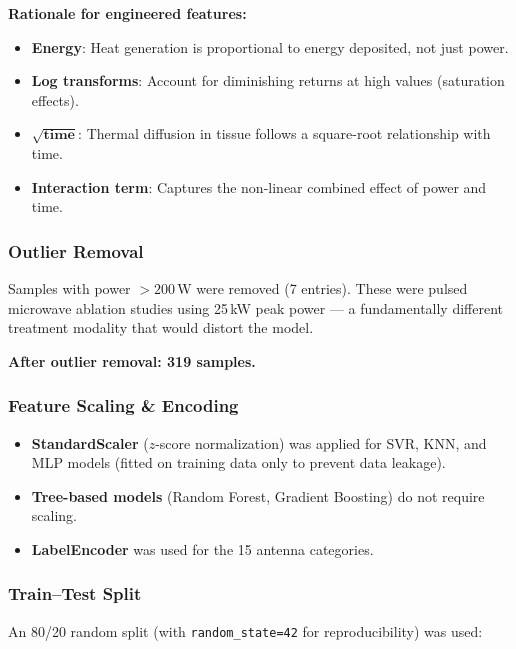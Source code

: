 \documentclass[12pt, a4paper]{article}
\begin{document}
\textbf{Rationale for engineered features:}
\begin{itemize}
    \item \textbf{Energy}: Heat generation is proportional to energy deposited, not just power.
    \item \textbf{Log transforms}: Account for diminishing returns at high values (saturation effects).
    \item $\boldsymbol{\sqrt{\text{time}}}$: Thermal diffusion in tissue follows a square-root relationship with time.
    \item \textbf{Interaction term}: Captures the non-linear combined effect of power and time.
\end{itemize}

\subsubsection{Outlier Removal}
\label{sec:outlier-removal}

Samples with power $>200$\,W were removed (7 entries). These were pulsed microwave ablation studies using 25\,kW peak power --- a fundamentally different treatment modality that would distort the model.

\textbf{After outlier removal: 319 samples.}

\subsubsection{Feature Scaling \& Encoding}
\label{sec:scaling}

\begin{itemize}
    \item \textbf{StandardScaler} ($z$-score normalization) was applied for SVR, KNN, and MLP models (fitted on training data only to prevent data leakage).
    \item \textbf{Tree-based models} (Random Forest, Gradient Boosting) do not require scaling.
    \item \textbf{LabelEncoder} was used for the 15 antenna categories.
\end{itemize}

\subsubsection{Train--Test Split}
\label{sec:train-test-split}

An 80/20 random split (with \texttt{random\_state=42} for reproducibility) was used:
\end{document}
